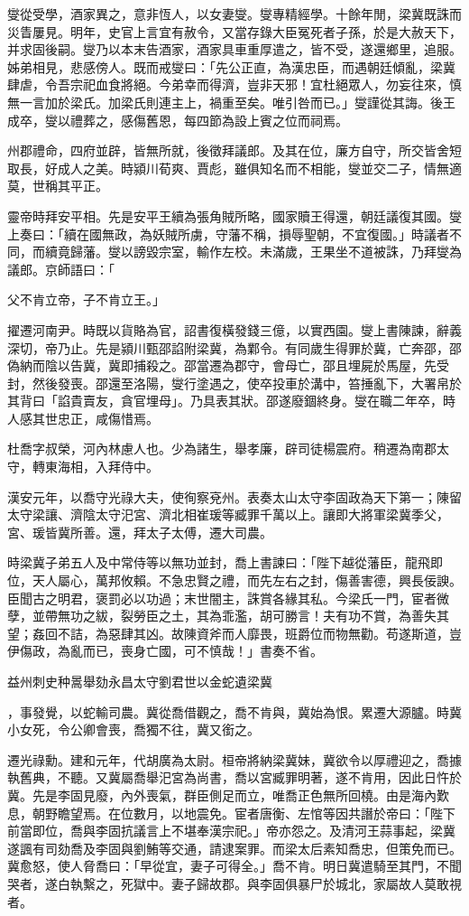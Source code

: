 \begin{pinyinscope}
燮從受學，酒家異之，意非恆人，以女妻燮。燮專精經學。十餘年閒，梁冀既誅而災眚屢見。明年，史官上言宜有赦令，又當存錄大臣冤死者子孫，於是大赦天下，并求固後嗣。燮乃以本末告酒家，酒家具車重厚遣之，皆不受，遂還鄉里，追服。姊弟相見，悲感傍人。既而戒燮曰：「先公正直，為漢忠臣，而遇朝廷傾亂，梁冀肆虐，令吾宗祀血食將絕。今弟幸而得濟，豈非天邪！宜杜絕眾人，勿妄往來，慎無一言加於梁氏。加梁氏則連主上，禍重至矣。唯引咎而已。」燮謹從其誨。後王成卒，燮以禮葬之，感傷舊恩，每四節為設上賓之位而祠焉。

州郡禮命，四府並辟，皆無所就，後徵拜議郎。及其在位，廉方自守，所交皆舍短取長，好成人之美。時潁川荀爽、賈彪，雖俱知名而不相能，燮並交二子，情無適莫，世稱其平正。

靈帝時拜安平相。先是安平王續為張角賊所略，國家贖王得還，朝廷議復其國。燮上奏曰：「續在國無政，為妖賊所虜，守藩不稱，損辱聖朝，不宜復國。」時議者不同，而續竟歸藩。燮以謗毀宗室，輸作左校。未滿歲，王果坐不道被誅，乃拜燮為議郎。京師語曰：「

父不肯立帝，子不肯立王。」

擢遷河南尹。時既以貨賂為官，詔書復橫發錢三億，以實西園。燮上書陳諫，辭義深切，帝乃止。先是潁川甄邵諂附梁冀，為鄴令。有同歲生得罪於冀，亡奔邵，邵偽納而陰以告冀，冀即捕殺之。邵當遷為郡守，會母亡，邵且埋屍於馬屋，先受封，然後發喪。邵還至洛陽，燮行塗遇之，使卒投車於溝中，笞捶亂下，大署帛於其背曰「諂貴賣友，貪官埋母」。乃具表其狀。邵遂廢錮終身。燮在職二年卒，時人感其世忠正，咸傷惜焉。

杜喬字叔榮，河內林慮人也。少為諸生，舉孝廉，辟司徒楊震府。稍遷為南郡太守，轉東海相，入拜侍中。

漢安元年，以喬守光祿大夫，使徇察兗州。表奏太山太守李固政為天下第一；陳留太守梁讓、濟陰太守汜宮、濟北相崔瑗等臧罪千萬以上。讓即大將軍梁冀季父，宮、瑗皆冀所善。還，拜太子太傅，遷大司農。

時梁冀子弟五人及中常侍等以無功並封，喬上書諫曰：「陛下越從藩臣，龍飛即位，天人屬心，萬邦攸賴。不急忠賢之禮，而先左右之封，傷善害德，興長佞諛。臣聞古之明君，褒罰必以功過；末世闇主，誅賞各緣其私。今梁氏一門，宦者微孽，並帶無功之紱，裂勞臣之土，其為乖濫，胡可勝言！夫有功不賞，為善失其望；姦回不詰，為惡肆其凶。故陳資斧而人靡畏，班爵位而物無勸。苟遂斯道，豈伊傷政，為亂而已，喪身亡國，可不慎哉！」書奏不省。

益州刺史种暠舉劾永昌太守劉君世以金蛇遺梁冀

，事發覺，以蛇輸司農。冀從喬借觀之，喬不肯與，冀始為恨。累遷大源臚。時冀小女死，令公卿會喪，喬獨不往，冀又銜之。

遷光祿勳。建和元年，代胡廣為太尉。桓帝將納梁冀妹，冀欲令以厚禮迎之，喬據執舊典，不聽。又冀屬喬舉汜宮為尚書，喬以宮臧罪明著，遂不肯用，因此日忤於冀。先是李固見廢，內外喪氣，群臣側足而立，唯喬正色無所回橈。由是海內歎息，朝野瞻望焉。在位數月，以地震免。宦者唐衡、左悺等因共譖於帝曰：「陛下前當即位，喬與李固抗議言上不堪奉漢宗祀。」帝亦怨之。及清河王蒜事起，梁冀遂諷有司劾喬及李固與劉鮪等交通，請逮案罪。而梁太后素知喬忠，但策免而已。冀愈怒，使人脅喬曰：「早從宜，妻子可得全。」喬不肯。明日冀遣騎至其門，不聞哭者，遂白執繫之，死獄中。妻子歸故郡。與李固俱暴尸於城北，家屬故人莫敢視者。


\end{pinyinscope}
